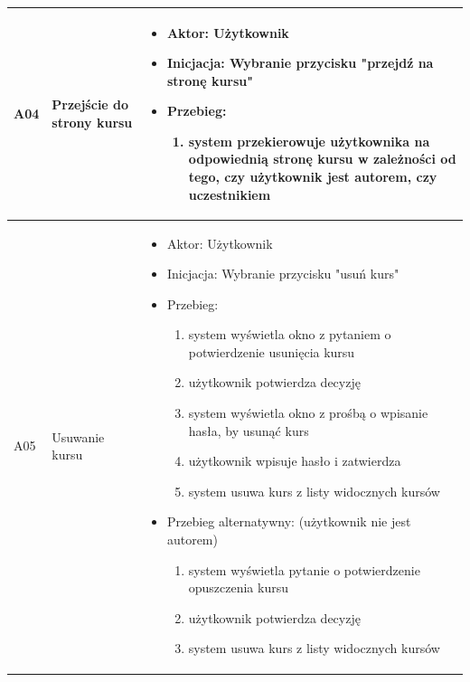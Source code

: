 \begin{longtable}{|p{1cm}|p{2cm}|p{11cm}|}
A04 & Przejście do strony kursu & \vspace{-\baselineskip}
\begin{itemize}[label={-},noitemsep,leftmargin=*,topsep=0pt,partopsep=0pt]
\item Aktor: Użytkownik
\item Inicjacja: Wybranie przycisku "przejdź na stronę kursu"
\item Przebieg:
	\begin{enumerate}
		\item system przekierowuje użytkownika na odpowiednią stronę kursu w zależności od tego, czy użytkownik jest autorem, czy uczestnikiem
	\end{enumerate}
\end{itemize} \\ \hline

A05 & Usuwanie kursu & \vspace{-\baselineskip}
\begin{itemize}[label={-},noitemsep,leftmargin=*,topsep=0pt,partopsep=0pt]
\item Aktor: Użytkownik
\item Inicjacja: Wybranie przycisku "usuń kurs"
\item Przebieg:
	\begin{enumerate}
		\item system wyświetla okno z pytaniem o potwierdzenie usunięcia kursu
		\item użytkownik potwierdza decyzję 
		\item system wyświetla okno z prośbą o wpisanie hasła, by usunąć kurs
		\item użytkownik wpisuje hasło i zatwierdza
		\item system usuwa kurs z listy widocznych kursów
	\end{enumerate}
\item Przebieg alternatywny: (użytkownik nie jest autorem)
	\begin{enumerate}
		\item system wyświetla pytanie o potwierdzenie opuszczenia kursu
		\item użytkownik potwierdza decyzję
		\item system usuwa kurs z listy widocznych kursów 
	\end{enumerate}
\end{itemize} \\\hline
\end{longtable}